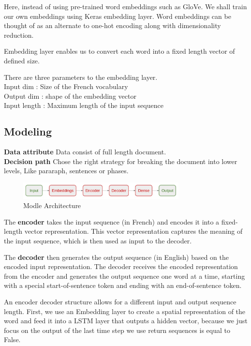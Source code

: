 \documentclass{article}
\begin{document}
Here, instead of using pre-trained word embeddings such as GloVe. We shall train our own embeddings using Keras embedding layer. Word embeddings can be thought of as an alternate to one-hot encoding along with dimensionality reduction.

Embedding layer enables us to convert each word into a fixed length vector of defined size.

There are three parameters to the embedding layer. \\
\textbullet  Input dim : Size of the French vocabulary \\ 
\textbullet Output dim : shape of the embedding vector \\ 
\textbullet Input length : Maximum length of the input sequence\\



\subsection{Modeling}
\textbf{Data attribute}  Data consist of full length document.\\
\textbf{Decision path} Chose the right strategy for breaking the document into lower levels, Like pararaph, sentences or phases.\\

\begin{figure}[htp]
    \centering
    \includegraphics[width=8.5cm]{7.jpg}
    \caption{Modle Architecture}
    \label{fig:galaxy}
\end{figure}


The \textbf{encoder} takes the input sequence (in French) and encodes it into a fixed-length vector representation. This vector representation captures the meaning of the input sequence, which is then used as input to the decoder.

The \textbf{decoder} then generates the output sequence (in English) based on the encoded input representation. The decoder receives the encoded representation from the encoder and generates the output sequence one word at a time, starting with a special start-of-sentence token and ending with an end-of-sentence token.\cite{rishita2019machine}

An encoder decoder structure allows for a different input and output sequence length. First, we use an Embedding layer to create a spatial representation of the word and feed it into a LSTM layer that outputs a hidden vector, because we just focus on the output of the last time step we use return sequences is equal to False.
\end{document}
